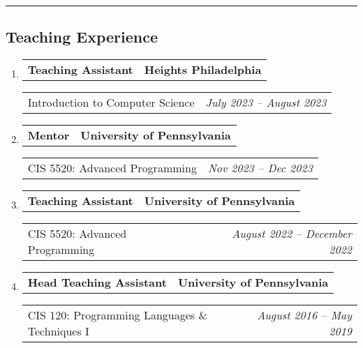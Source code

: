 \documentclass[letterpaper]{article}
\makeatletter
\newif\iflong
\newcommand*{\tabulardef}[3]{\begin{tabular}[t]{@{}lp{\dimexpr\linewidth-#1}@{}}
    #2&#3
\end{tabular}}
\newcommand{\headerrow}[2]
{\begin{tabular*}{\linewidth}{l@{\extracolsep{\fill}}r}
	#1 &
	#2 \\
\end{tabular*}}
\makeatother
\begin{document}
\hrule
\subsection*{Teaching Experience}
\begin{enumerate}[label=]
	\parskip=-0.05em
    \item
		\headerrow
			{\textbf{Teaching Assistant}}
			{\textbf{Heights Philadelphia}}
	\headerrow
		{Introduction to Computer Science}
		{\emph{July 2023 -- August 2023}}
    \iflong
	\begin{enumerate}[label= *]
		\parskip=-0.1em
    \item\tabulardef{5cm}{}{Introduce computer science to middle school students from underrepresented backgrounds in STEM using various in-class exercises}
	\end{enumerate}
    \fi

    \item
        \headerrow
            {\textbf{Mentor}}
            {\textbf{University of Pennsylvania}}
        \headerrow
            {CIS 5520: Advanced Programming}
            {\emph{Nov 2023 -- Dec 2023}}
        \iflong
        \begin{enumerate}[label= *]
            \parskip=-0.1em
        \item\tabulardef{5cm}{}{Advise student groups on a final project of their choosing in Haskell showcasing the material covered over the course of the semester}
        \end{enumerate}
        \fi

	\item
		\headerrow
			{\textbf{Teaching Assistant}}
			{\textbf{University of Pennsylvania}}
	\headerrow
		{CIS 5520: Advanced Programming}
		{\emph{August 2022 -- December 2022}}
    \iflong
	\begin{enumerate}[label= *]
		\parskip=-0.1em
        \item\tabulardef{5cm}{}{Assist with in-class discussion and cooperative exercises centered around functional programming patterns in the Haskell programming language}        
        \item\tabulardef{5cm}{}{Advise student groups on a final project of their choosing in Haskell showcasing the material covered over the course of the semester}
	\end{enumerate}
    \fi

	\item
		\headerrow
			{\textbf{Head Teaching Assistant}}
			{\textbf{University of Pennsylvania}}
	\headerrow
		{CIS 120: Programming Languages \& Techniques I}
		{\emph{August 2016 -- May 2019}}
    \iflong
	\begin{enumerate}[label= *]
		\parskip=-0.1em
        \item\tabulardef{5cm}{}{Co-lead and prepare a weekly recitation to review course material on core programming languages and techniques, taught in OCaml and then Java}
		\item Hire and train new teaching assistants
	\end{enumerate}
    \fi
\end{enumerate}
\end{document}
